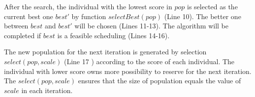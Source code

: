 \documentclass[journal]{IEEEtran}
\newcommand{\calS}{\mathcal{S}}
\theoremstyle{remark}
\begin{document}
After the search, the individual with the lowest score in $pop$ is selected as the current best one $best'$ by function $selectBest(pop)$ (Line 10).
The better one between $best$ and $best'$ will be chosen (Lines 11-13).
The algorithm will be completed if $best$ is a feasible scheduling (Lines 14-16).

The new population for the next iteration is generated by selection $select(pop,scale)$ (Line 17  ) according to the score of each individual.
The individual with lower score owns more possibility to reserve for the next iteration.
The $select(pop,scale)$ ensures that the size of population equals the value of $scale$ in each iteration.

\end{document}

